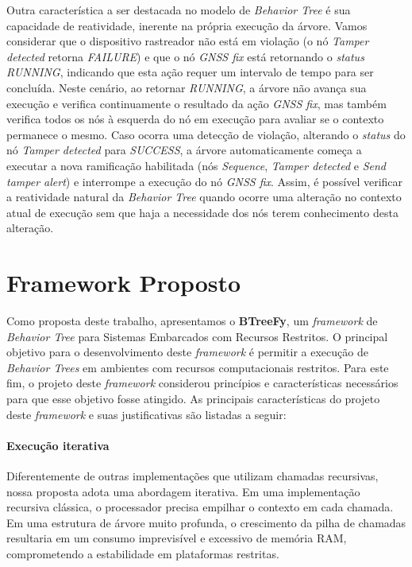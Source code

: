 \documentclass[conference]{IEEEtran}
\begin{document}
Outra característica a ser destacada no modelo de \textit{Behavior Tree} é sua capacidade de reatividade, inerente na própria execução da árvore. Vamos considerar que o dispositivo rastreador não está em violação (o nó \textit{Tamper detected} retorna \textit{FAILURE}) e que o nó \textit{GNSS fix} está retornando o \textit{status} \textit{RUNNING}, indicando que esta ação requer um intervalo de tempo para ser concluída. Neste cenário, ao retornar \textit{RUNNING}, a árvore não avança sua execução e verifica continuamente o resultado da ação \textit{GNSS fix}, mas também verifica todos os nós à esquerda do nó em execução para avaliar se o contexto permanece o mesmo. Caso ocorra uma detecção de violação, alterando o \textit{status} do nó \textit{Tamper detected} para \textit{SUCCESS}, a árvore automaticamente começa a executar a nova ramificação habilitada (nós \textit{Sequence}, \textit{Tamper detected} e \textit{Send tamper alert}) e interrompe a execução do nó \textit{GNSS fix}. Assim, é possível verificar a reatividade natural da \textit{Behavior Tree} quando ocorre uma alteração no contexto atual de execução sem que haja a necessidade dos nós terem conhecimento desta alteração.

\section{Framework Proposto}

Como proposta deste trabalho, apresentamos o \textbf{BTreeFy}, um \textit{framework} de \textit{Behavior Tree} para Sistemas Embarcados com Recursos Restritos. O principal objetivo para o desenvolvimento deste \textit{framework} é permitir a execução de \textit{Behavior Trees} em ambientes com recursos computacionais restritos. Para este fim, o projeto deste \textit{framework} considerou princípios e características necessários para que esse objetivo fosse atingido.
As principais características do projeto deste \textit{framework} e suas justificativas são listadas a seguir:


\paragraph{\textbf{Execução iterativa}} Diferentemente de outras implementações que utilizam chamadas recursivas, nossa proposta adota uma abordagem iterativa. Em uma implementação recursiva clássica, o processador precisa empilhar o contexto em cada chamada. Em uma estrutura de árvore muito profunda, o crescimento da pilha de chamadas resultaria em um consumo imprevisível e excessivo de memória RAM, comprometendo a estabilidade em plataformas restritas.
\end{document}
